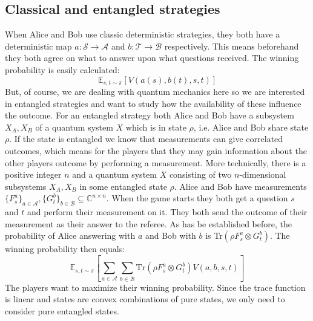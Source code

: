 \subsection{Classical and entangled strategies}
When Alice and Bob use classic deterministic strategies, they both have a deterministic map $a : \mathcal{S} \rightarrow \mathcal{A}$ and $b : \mathcal{T} \rightarrow \mathcal{B}$ respectively. This means beforehand they both agree on what to answer upon what questions received. The winning probability is easily calculated: 
\begin{equation}
\mathbb{E}_{s,t \sim \pi} \left[ V(a(s),b(t),s,t) \right] 
\end{equation}
But, of course, we are dealing with quantum mechanics here so we are interested in entangled strategies and want to study how the availability of these influence the outcome. For an entangled strategy both Alice and Bob have a subsystem $X_A, X_B$ of a quantum system $X$ which is in state $\rho$, i.e. Alice and Bob share state $\rho$. If the state is entangled we know that measurements can give correlated outcomes, which means for the players that they may gain information about the other players outcome by performing a measurement. More technically, there is a positive integer $n$ and a quantum system $X$ consisting of two $n$-dimensional subsystems $X_A, X_B$ in some entangled state $\rho$. Alice and Bob have measurements $\{ F_s^a \}_{a\in \mathcal{A}} , \{ G_t^b\}_{b \in \mathcal{B}} \subseteq \mathbb{C}^{n \times n}$. When the game starts they both get a question $s$ and $t$ and perform their measurement on it. They both send the outcome of their measurement as their answer to the referee. As has be established before, the probability of Alice answering with $a$ and Bob with $b$ is Tr$(\rho F_s^a \otimes G_t^b)$. The winning probability then equals:
\begin{equation}
\mathbb{E}_{s,t \sim \pi} \left[ \sum_{a \in \mathcal{A}} \sum_{b \in \mathcal{B}} \text{Tr}(\rho F_s^a \otimes G_t^b) V(a,b,s,t) \right]
\end{equation}  
The players want to maximize their winning probability. Since the trace function is linear and states are convex combinations of pure states, we only need to consider pure entangled states. 
